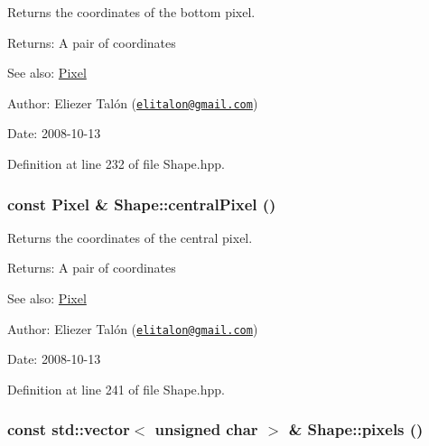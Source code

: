 Returns the coordinates of the bottom pixel. 

\begin{Desc}
\item[Returns:]A pair of coordinates\end{Desc}
\begin{Desc}
\item[See also:]\hyperlink{_pixel_8hpp_535e59456e3e633842529cfa8ea103c4}{Pixel}\end{Desc}
\begin{Desc}
\item[Author:]Eliezer Talón (\href{mailto:elitalon@gmail.com}{\tt elitalon@gmail.com}) \end{Desc}
\begin{Desc}
\item[Date:]2008-10-13 \end{Desc}


Definition at line 232 of file Shape.hpp.\hypertarget{class_shape_cae0adae98c38009c8241ef0baa169c3}{
\subsubsection[centralPixel]{\setlength{\rightskip}{0pt plus 5cm}const {\bf Pixel} \& Shape::centralPixel ()}}
\label{class_shape_cae0adae98c38009c8241ef0baa169c3}


Returns the coordinates of the central pixel. 

\begin{Desc}
\item[Returns:]A pair of coordinates\end{Desc}
\begin{Desc}
\item[See also:]\hyperlink{_pixel_8hpp_535e59456e3e633842529cfa8ea103c4}{Pixel}\end{Desc}
\begin{Desc}
\item[Author:]Eliezer Talón (\href{mailto:elitalon@gmail.com}{\tt elitalon@gmail.com}) \end{Desc}
\begin{Desc}
\item[Date:]2008-10-13 \end{Desc}


Definition at line 241 of file Shape.hpp.\hypertarget{class_shape_7623c856a1a7916fc000f43d5efdba5b}{
\subsubsection[pixels]{\setlength{\rightskip}{0pt plus 5cm}const std::vector$<$ unsigned char $>$ \& Shape::pixels ()}}
\label{class_shape_7623c856a1a7916fc000f43d5efdba5b}


